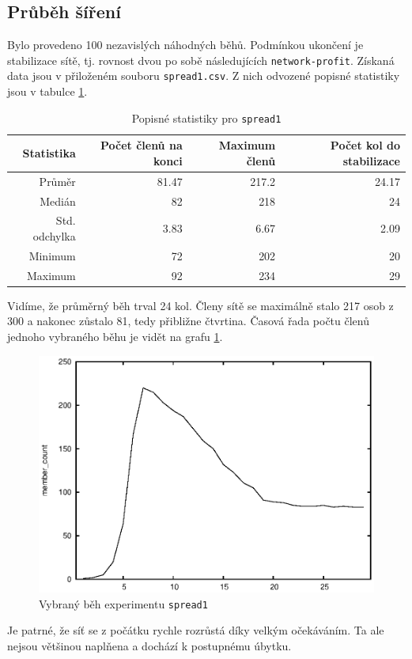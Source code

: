 \documentclass[a4wide,12pt]{report}
\begin{document}
\subsection{Průběh šíření}
Bylo provedeno 100 nezavislých náhodných běhů. Podmínkou ukončení je stabilizace sítě, tj. rovnost dvou po sobě následujících \texttt{network-profit}. Získaná data jsou v přiloženém souboru \texttt{spread1.csv}. Z nich odvozené popisné statistiky jsou v tabulce \ref{tab:spread1_desc}.
\begin{table}[h]
  \begin{center}
  \begin{tabular}{|r|r|r|r|}
  \hline
  Statistika&Počet členů na konci	&Maximum členů	&Počet kol do stabilizace\\\hline
  Průměr	&81.47	&217.2	&24.17\\
  Medián	&82	&218	&24\\
  Std. odchylka	&3.83	&6.67	&2.09\\
  Minimum	&72	&202	&20\\
  Maximum	&92	&234	&29\\\hline
  \end{tabular}
  \end{center}
  \caption{Popisné statistiky pro \texttt{spread1}}
  \label{tab:spread1_desc}
\end{table}
Vidíme, že průměrný běh trval 24 kol. Členy sítě se maximálně stalo 217 osob z 300 a nakonec zůstalo 81, tedy přibližne čtvrtina. Časová řada počtu členů jednoho vybraného běhu je vidět na grafu \ref{fig:spread1_run}.
\begin{figure}[h]
  \centering
  \includegraphics{member_count.eps}
  \caption{Vybraný běh experimentu \texttt{spread1}}
  \label{fig:spread1_run}
\end{figure}
Je patrné, že síť se z počátku rychle rozrůstá díky velkým očekáváním. Ta ale nejsou většinou naplňena a dochází k postupnému úbytku.
\end{document}

